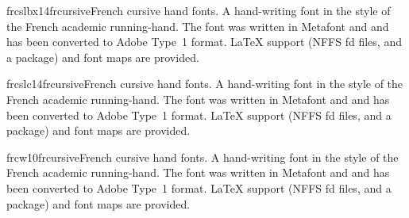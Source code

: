 \documentclass{ddltxtyp}
\begin{document}
\begin{package}{frcslbx14}{frcursive}{French cursive hand fonts.}
A hand-writing font in the style of the French academic
running-hand. The font was written in Metafont and and has been
converted to Adobe Type~1 format. {\LaTeX} support (NFFS fd files,
and a package) and font maps are provided.
\end{package}
\begin{package}{frcslc14}{frcursive}{French cursive hand fonts.}
A hand-writing font in the style of the French academic
running-hand. The font was written in Metafont and and has been
converted to Adobe Type~1 format. {\LaTeX} support (NFFS fd files,
and a package) and font maps are provided.
\end{package}
\begin{package}{frcw10}{frcursive}{French cursive hand fonts.}
A hand-writing font in the style of the French academic
running-hand. The font was written in Metafont and and has been
converted to Adobe Type~1 format. {\LaTeX} support (NFFS fd files,
and a package) and font maps are provided.
\end{package}

\end{document}

